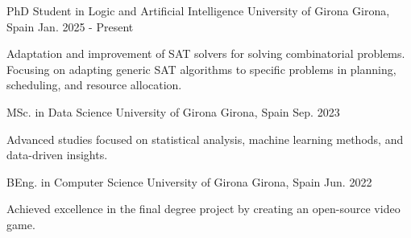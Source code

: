 

\begin{cventries}

  \cventry
    {PhD Student in Logic and Artificial Intelligence} %
    {University of Girona} %
    {Girona, Spain} %
    {Jan. 2025 - Present} %
    {
      \begin{cvitems} %
      \item {Adaptation and improvement of SAT solvers for solving
        combinatorial problems. Focusing on adapting generic SAT algorithms
    to specific problems in planning, scheduling, and resource allocation.}
      \end{cvitems}
    }
  \cventry
    {MSc. in Data Science} %
    {University of Girona} %
    {Girona, Spain} %
    {Sep. 2023} %
    {
      \begin{cvitems} %
      \item {Advanced studies focused on statistical analysis, machine learning methods, and data-driven insights.}
      \end{cvitems}
    }

    \cventry
    {BEng. in Computer Science} %
    {University of Girona} %
    {Girona, Spain} %
    {Jun. 2022} %
    {
      \begin{cvitems} %
        \item {Achieved excellence in the final degree project by creating an open-source video game.}
      \end{cvitems}
    }

\end{cventries}

